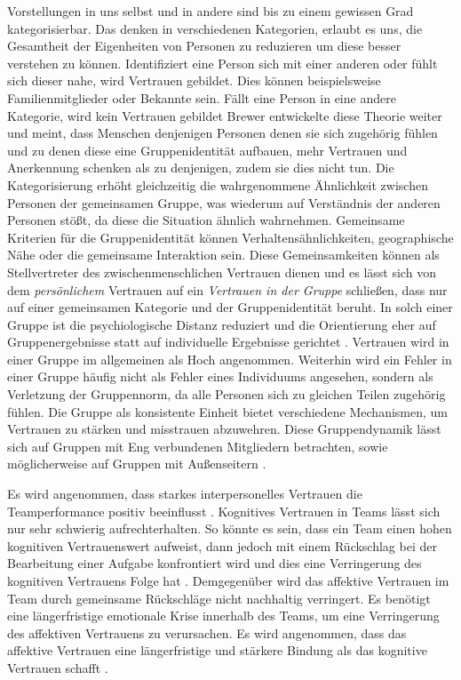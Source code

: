 \documentclass[a4paper,11pt]{article}%
\renewcommand{\\}{\vspace*{0.5\baselineskip} \newline}
\begin{document}
Vorstellungen in uns selbst und in andere sind bis zu einem gewissen Grad kategorisierbar. Das denken in verschiedenen Kategorien, erlaubt es uns, die Gesamtheit der Eigenheiten von Personen zu reduzieren um diese besser verstehen zu können. Identifiziert eine Person sich mit einer anderen oder fühlt sich dieser nahe, wird Vertrauen gebildet. Dies können beispielsweise Familienmitglieder oder Bekannte sein. Fällt eine Person in eine andere Kategorie, wird kein Vertrauen gebildet
\citep[397-403]{stolle2002trusting}
Brewer entwickelte diese Theorie weiter und meint, dass Menschen denjenigen Personen denen sie sich zugehörig fühlen und zu denen diese eine Gruppenidentität aufbauen, mehr Vertrauen und Anerkennung schenken als zu denjenigen, zudem sie dies nicht tun. Die Kategorisierung erhöht gleichzeitig die wahrgenommene Ähnlichkeit zwischen Personen der gemeinsamen Gruppe, was wiederum auf Verständnis der anderen Personen stößt, da diese die Situation ähnlich wahrnehmen.
Gemeinsame Kriterien für die Gruppenidentität können Verhaltensähnlichkeiten, geographische Nähe oder die gemeinsame Interaktion sein. Diese Gemeinsamkeiten können als Stellvertreter des zwischenmenschlichen Vertrauen dienen und es lässt sich von dem \textit{persönlichem} Vertrauen auf ein \textit{Vertrauen in der Gruppe} schließen, dass nur auf einer gemeinsamen Kategorie und der Gruppenidentität beruht.
In solch einer Gruppe ist die psychiologische Distanz reduziert und die Orientierung eher auf Gruppenergebnisse statt auf individuelle Ergebnisse gerichtet \citep[355-360]{brewer1981}.
Vertrauen wird in einer Gruppe im allgemeinen als Hoch angenommen. Weiterhin wird ein Fehler in einer Gruppe häufig nicht als Fehler eines Individuums angesehen, sondern als Verletzung der Gruppennorm, da alle Personen sich zu gleichen Teilen zugehörig fühlen. Die Gruppe als konsistente Einheit bietet verschiedene Mechanismen, um Vertrauen zu stärken und misstrauen abzuwehren. Diese Gruppendynamik lässt sich auf Gruppen mit Eng verbundenen Mitgliedern betrachten, sowie möglicherweise auf Gruppen mit Außenseitern \citep[397-403]{stolle2002trusting}.

Es wird angenommen, dass starkes interpersonelles Vertrauen die Teamperformance positiv beeinflusst \citep{mcallister1995affect} \citep{mayer1995integrative} \citep{dirks2002trust}.
Kognitives Vertrauen in Teams lässt sich nur sehr schwierig aufrechterhalten. So könnte es sein, dass ein Team einen hohen kognitiven Vertrauenswert aufweist, dann jedoch mit einem Rückschlag bei der Bearbeitung einer Aufgabe konfrontiert wird und dies eine Verringerung des kognitiven Vertrauens Folge hat \citep[S.29-31]{mcallister1995affect}.
Demgegenüber wird das affektive Vertrauen im Team durch gemeinsame Rückschläge nicht nachhaltig verringert. Es benötigt eine längerfristige emotionale Krise innerhalb des Teams, um eine Verringerung des affektiven Vertrauens zu verursachen. Es wird angenommen, dass das affektive Vertrauen eine längerfristige und stärkere Bindung als das kognitive Vertrauen schafft \citep[S.29-31]{mcallister1995affect}.
\end{document}
